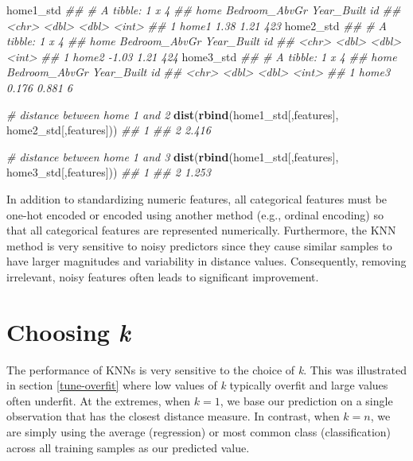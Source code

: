 \documentclass[]{krantz}
\makeatletter
\newenvironment{Shaded}{\begin{snugshade}}{\end{snugshade}}
\newcommand{\CommentTok}[1]{\textcolor[rgb]{0.37,0.37,0.37}{\textit{#1}}}
\newcommand{\KeywordTok}[1]{\textcolor[rgb]{0.27,0.27,0.27}{\textbf{#1}}}
\newcommand{\NormalTok}[1]{#1}
\newenvironment{kframe}{%
\medskip{}
\setlength{\fboxsep}{.8em}
 \def\at@end@of@kframe{}%
 \ifinner\ifhmode%
  \def\at@end@of@kframe{\end{minipage}}%
  \begin{minipage}{\columnwidth}%
 \fi\fi%
 \def\FrameCommand##1{\hskip\@totalleftmargin \hskip-\fboxsep
 \colorbox{shadecolor}{##1}\hskip-\fboxsep
     \hskip-\linewidth \hskip-\@totalleftmargin \hskip\columnwidth}%
 \MakeFramed {\advance\hsize-\width
   \@totalleftmargin\z@ \linewidth\hsize
   \@setminipage}}%
 {\par\unskip\endMakeFramed%
 \at@end@of@kframe}
\renewenvironment{Shaded}{\begin{kframe}}{\end{kframe}}
\makeatother
\begin{document}
\begin{Shaded}
\begin{Highlighting}[]
\NormalTok{home1_std}
\CommentTok{## # A tibble: 1 x 4}
\CommentTok{##   home  Bedroom_AbvGr Year_Built    id}
\CommentTok{##   <chr>         <dbl>      <dbl> <int>}
\CommentTok{## 1 home1          1.38       1.21   423}
\NormalTok{home2_std}
\CommentTok{## # A tibble: 1 x 4}
\CommentTok{##   home  Bedroom_AbvGr Year_Built    id}
\CommentTok{##   <chr>         <dbl>      <dbl> <int>}
\CommentTok{## 1 home2         -1.03       1.21   424}
\NormalTok{home3_std}
\CommentTok{## # A tibble: 1 x 4}
\CommentTok{##   home  Bedroom_AbvGr Year_Built    id}
\CommentTok{##   <chr>         <dbl>      <dbl> <int>}
\CommentTok{## 1 home3         0.176      0.881     6}

\CommentTok{# distance between home 1 and 2}
\KeywordTok{dist}\NormalTok{(}\KeywordTok{rbind}\NormalTok{(home1_std[,features], home2_std[,features]))}
\CommentTok{##       1}
\CommentTok{## 2 2.416}

\CommentTok{# distance between home 1 and 3}
\KeywordTok{dist}\NormalTok{(}\KeywordTok{rbind}\NormalTok{(home1_std[,features], home3_std[,features]))}
\CommentTok{##       1}
\CommentTok{## 2 1.253}
\end{Highlighting}
\end{Shaded}

In addition to standardizing numeric features, all categorical features must be one-hot encoded or encoded using another method (e.g., ordinal encoding) so that all categorical features are represented numerically. Furthermore, the KNN method is very sensitive to noisy predictors since they cause similar samples to have larger magnitudes and variability in distance values. Consequently, removing irrelevant, noisy features often leads to significant improvement.

\hypertarget{choosing-k}{%
\section{\texorpdfstring{Choosing \emph{k}}{Choosing k}}\label{choosing-k}}

The performance of KNNs is very sensitive to the choice of \emph{k}. This was illustrated in section \ref{tune-overfit} where low values of \emph{k} typically overfit and large values often underfit. At the extremes, when \(k = 1\), we base our prediction on a single observation that has the closest distance measure. In contrast, when \(k = n\), we are simply using the average (regression) or most common class (classification) across all training samples as our predicted value.
\end{document}
